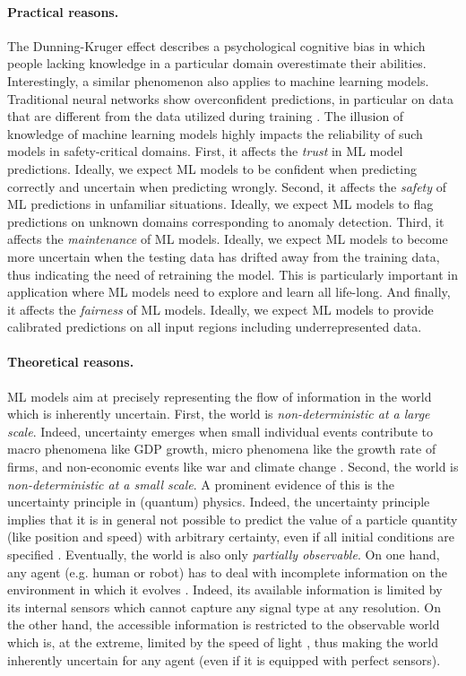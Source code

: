\paragraph*{Practical reasons.} The Dunning-Kruger effect \cite{dunning-kruger} describes a psychological cognitive bias in which people lacking knowledge in a particular domain overestimate their abilities. Interestingly, a similar phenomenon also applies to machine learning models. Traditional neural networks show overconfident predictions, in particular on data that are different from the data utilized during training \cite{overconfident-relu}. The illusion of knowledge of machine learning models highly impacts the reliability of such  models  in  safety-critical  domains.
First, it affects the \emph{trust} in ML model predictions. Ideally, we expect ML models to be confident when predicting correctly and uncertain when predicting wrongly. 
Second, it affects the \emph{safety} of ML predictions in unfamiliar situations. Ideally, we expect ML models to flag predictions on unknown domains corresponding to anomaly detection.
Third, it affects the \emph{maintenance} of ML models. Ideally, we expect ML models to become more uncertain when the testing data has drifted away from the training data, thus indicating the need of retraining the model. This is particularly important in application where ML models need to explore and learn all life-long.
And finally, it affects the \emph{fairness} of ML models. Ideally, we expect ML models to provide calibrated predictions on all input regions including underrepresented data.

\paragraph*{Theoretical reasons.} ML models aim at precisely representing the flow of information in the world which is inherently uncertain.
First, the world is \emph{non-deterministic at a large scale}. Indeed, uncertainty emerges when small individual events contribute to macro phenomena like GDP growth, micro phenomena like the growth rate of firms, and non-economic events like war and climate change \cite{macro-micro-uncertainty}.
Second, the world is \emph{non-deterministic at a small scale}. A prominent evidence of this is the uncertainty principle in (quantum) physics. Indeed, the uncertainty principle implies that it is in general not possible to predict the value of a particle quantity (like position and speed) with arbitrary certainty, even if all initial conditions are specified \cite{hilgevoord2016heisenberg}.
Eventually, the world is also only \emph{partially observable}. On one hand, any agent (e.g. human or robot) has to deal with incomplete information on the environment in which it evolves \cite{kaelbling1998pomdp}. Indeed, its available information is limited by its internal sensors which cannot capture any signal type at any resolution. On the other hand, the accessible information is restricted to the observable world which is, at the extreme, limited by the speed of light \cite{ord2021universe}, thus making the world inherently uncertain for any agent (even if it is equipped with perfect sensors).

